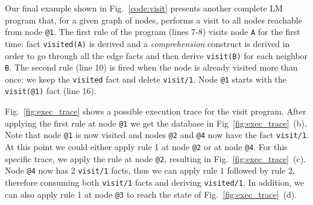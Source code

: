 Our final example shown in Fig.~\ref{code:visit} presents another complete LM
program that, for a given graph of nodes, performs a visit to all nodes
reachable from node \texttt{@1}.  The first rule of the program (lines 7-8)
visits node \texttt{A} for the first time: fact \texttt{visited(A)} is
derived and a \emph{comprehension} construct is derived in order to go
through all the edge facts and then derive \texttt{visit(B)} for each
neighbor \texttt{B}.  The second rule (line 10) is fired when the node is
already visited more than once: we keep the \texttt{visited} fact and delete
\texttt{visit/1}.  Node \texttt{@1} starts with the \texttt{visit(@1)} fact
(line 16).

Fig.~\ref{fig:exec_trace} shows a possible execution trace for the visit
program.  After applying the first rule at node \texttt{@1} we get the database
in Fig~\ref{fig:exec_trace}~(b).  Note that node \texttt{@1} is now visited and
nodes \texttt{@2} and \texttt{@4} now have the fact \texttt{visit/1}. At this
point we could either apply rule 1 at node \texttt{@2} or at node \texttt{@4}.
For this specific trace, we apply the rule at node \texttt{@2}, resulting in
Fig.~\ref{fig:exec_trace}~(c). Node \texttt{@4} now has 2 \texttt{visit/1}
facts, thus we can apply rule 1 followed by rule 2, therefore consuming both
\texttt{visit/1} facts and deriving \texttt{visited/1}. In addition, we can also
apply rule 1 at node \texttt{@3} to reach the state of
Fig.~\ref{fig:exec_trace}~(d).

